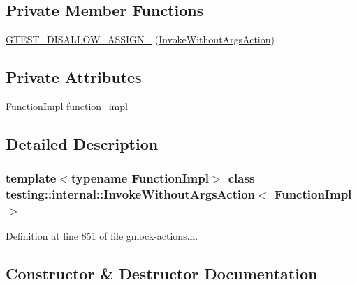 \subsection*{Private Member Functions}
\begin{DoxyCompactItemize}
\item 
\hyperlink{classtesting_1_1internal_1_1InvokeWithoutArgsAction_a0fd67dbc88793c8a9cf3c31ab44de1c0}{G\+T\+E\+S\+T\+\_\+\+D\+I\+S\+A\+L\+L\+O\+W\+\_\+\+A\+S\+S\+I\+G\+N\+\_\+} (\hyperlink{classtesting_1_1internal_1_1InvokeWithoutArgsAction}{Invoke\+Without\+Args\+Action})
\end{DoxyCompactItemize}
\subsection*{Private Attributes}
\begin{DoxyCompactItemize}
\item 
Function\+Impl \hyperlink{classtesting_1_1internal_1_1InvokeWithoutArgsAction_a29e9e7e089dd4b66fc931c0da54809b1}{function\+\_\+impl\+\_\+}
\end{DoxyCompactItemize}


\subsection{Detailed Description}
\subsubsection*{template$<$typename Function\+Impl$>$\newline
class testing\+::internal\+::\+Invoke\+Without\+Args\+Action$<$ Function\+Impl $>$}



Definition at line 851 of file gmock-\/actions.\+h.



\subsection{Constructor \& Destructor Documentation}
\mbox{\label{classtesting_1_1internal_1_1InvokeWithoutArgsAction_a05d4006d8ab70e78172bf678b1d15f18}} 
